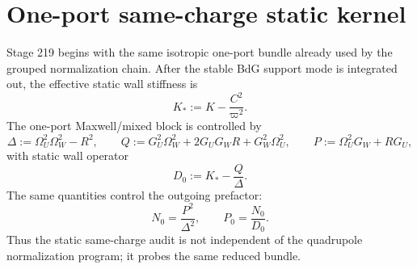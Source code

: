 \section{One-port same-charge static kernel}
\label{sec:app-part07_same_charge_rigid_mouth:one-port-same-charge-static-kernel}

Stage 219 begins with the same isotropic one-port bundle already used by the grouped normalization chain.  After the stable BdG support mode is integrated out, the effective static wall stiffness is
\begin{equation}
\label{eq:app-part07-kstar}
K_*:=K-\frac{C^2}{\varpi^2}.
\end{equation}
The one-port Maxwell/mixed block is controlled by
\begin{equation}
\label{eq:app-part07-static-delta-qp}
\Delta:=\Omega_U^2\Omega_W^2-R^2,
\qquad
Q:=G_U^2\Omega_W^2+2G_UG_WR+G_W^2\Omega_U^2,
\qquad
P:=\Omega_U^2G_W+RG_U,
\end{equation}
with static wall operator
\begin{equation}
\label{eq:app-part07-static-d0}
D_0:=K_* - \frac{Q}{\Delta}.
\end{equation}
The same quantities control the outgoing prefactor:
\begin{equation}
\label{eq:app-part07-static-n0-p0}
N_0=\frac{P^2}{\Delta^2},
\qquad
P_0=\frac{N_0}{D_0}.
\end{equation}
Thus the static same-charge audit is not independent of the quadrupole normalization program; it probes the same reduced bundle.

